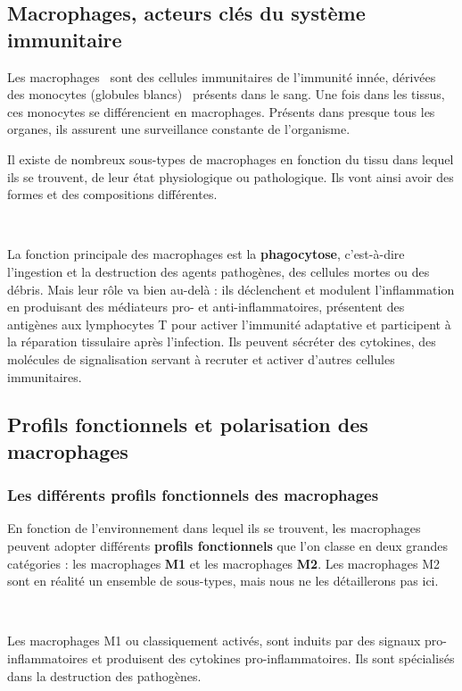 \documentclass[a4paper,12pt]{report}
\begin{document}
\subsection{Macrophages, acteurs clés du système immunitaire}
Les macrophages~\cite{macro} sont des cellules immunitaires de l'immunité innée, dérivées des monocytes (globules blancs)~\cite{monocyte} présents dans le sang. Une fois dans les tissus, ces monocytes se différencient en macrophages. Présents dans presque tous les organes, ils assurent une surveillance constante de l'organisme.

Il existe de nombreux sous-types de macrophages en fonction du tissu dans lequel ils se trouvent, de leur état physiologique ou pathologique. Ils vont ainsi avoir des formes et des compositions différentes.

\

La fonction principale des macrophages est la \textbf{phagocytose}, c'est-à-dire l'ingestion et la destruction des agents pathogènes, des cellules mortes ou des débris. Mais leur rôle va bien au-delà : ils déclenchent et modulent l'inflammation en produisant des médiateurs pro- et anti-inflammatoires, présentent des antigènes aux lymphocytes T pour activer l'immunité adaptative et participent à la réparation tissulaire après l'infection. Ils peuvent sécréter des cytokines, des molécules de signalisation servant à recruter et activer d'autres cellules immunitaires.

\subsection{Profils fonctionnels et polarisation des macrophages}
\subsubsection{Les différents profils fonctionnels des macrophages}

En fonction de l'environnement dans lequel ils se trouvent, les macrophages peuvent adopter différents \textbf{profils fonctionnels} que l'on classe en deux grandes catégories : les macrophages \textbf{M1} et les macrophages \textbf{M2}. Les macrophages M2 sont en réalité un ensemble de sous-types, mais nous ne les détaillerons pas ici.

\

Les macrophages M1 ou \og classiquement activés\fg, sont induits par des signaux pro-inflammatoires et produisent des cytokines pro-inflammatoires. Ils sont spécialisés dans la destruction des pathogènes.
\end{document}
